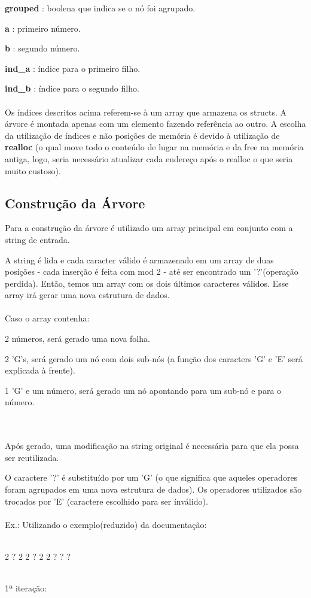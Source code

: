 \documentclass{article}
\begin{document}
\textbf{grouped}     : boolena que indica se o nó foi agrupado.

\textbf{a}           : primeiro número.

\textbf{b}           : segundo número.

\textbf{ind\_a}      : índice para o primeiro filho.

\textbf{ind\_b}      : índice para o segundo filho.
\\
\\
Os índices descritos acima referem-se à um array que armazena os structs. A árvore é montada apenas com um elemento fazendo referência ao outro.
A escolha da utilização de índices e não posições de memória é devido à utilização de \textbf{realloc} (o qual move todo o conteúdo de lugar na memória e da free na memória antiga, logo, seria necessário atualizar cada endereço após o realloc o que seria muito custoso).

\subsection{Construção da Árvore}
Para a construção da árvore é utilizado um array principal em conjunto com a string de entrada.

A string é lida e cada caracter válido é armazenado em um array de duas posições - cada inserção é feita com mod 2 - até ser encontrado um '?'(operação perdida). Então, temos um array com os dois últimos caracteres válidos. Esse array irá gerar uma nova estrutura de dados.
\\
\\
Caso o array contenha:
\begin{list_type}
\item 2 números, será gerado uma nova folha.
\item 2 'G's, será gerado um nó com dois sub-nós (a função dos caracters 'G' e 'E' será explicada à frente).
\item 1 'G' e um número, será gerado um nó apontando para um sub-nó e para o número.
\end{list_type}
\\
\\
Após gerado, uma modificação na string original é necessária para que ela possa ser reutilizada.

O caractere '?' é substituído por um 'G' (o que significa que aqueles operadores foram agrupados em uma nova estrutura de dados). Os operadores utilizados são trocados por 'E' (caractere escolhido para ser ínválido).
\\
\\
Ex.:
Utilizando o exemplo(reduzido) da documentação:\\ \\
{ 2 ? 2 2 ? 2 2 ? ? ?\par
}\\
1ª iteração:
\end{document}
